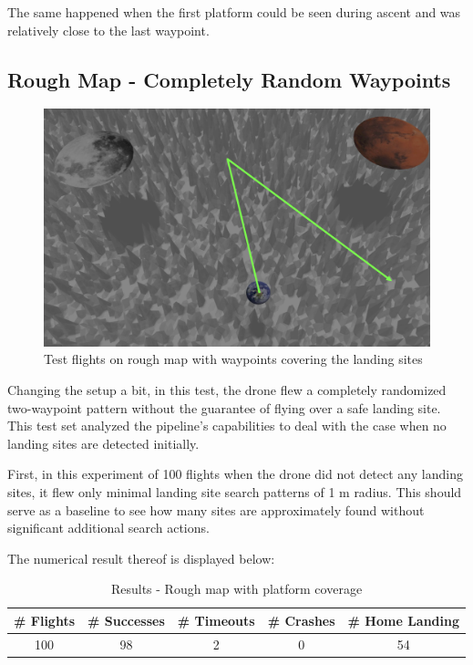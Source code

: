         The same happened when the first platform could be seen during ascent and was relatively close to the last waypoint.


\subsection{Rough Map - Completely Random Waypoints}\label{subsec:rough_map_rw}

    \begin{figure}[h]
        \centering
        \includegraphics[scale=0.24]{images/evaluation/rough_complete_rand.png}
        \caption{Test flights on rough map with waypoints covering the landing sites}
        \label{fig:rough_compl_rand}
    \end{figure}

    Changing the setup a bit, in this test, the drone flew a completely randomized two-waypoint pattern without the guarantee of flying over a safe landing site. This test set analyzed the pipeline's capabilities to deal with the case when no landing sites are detected initially.

    First, in this experiment of 100 flights when the drone did not detect any landing sites, it flew only minimal landing site search patterns of 1 m radius. This should serve as a baseline to see how many sites are approximately found without significant additional search actions.

    The numerical result thereof is displayed below:

    \begin{table}[h]
        \begin{center}
         \caption{Results - Rough map with platform coverage}\vspace{1ex}
         \label{tab:result_rough_rand}
         \begin{tabular}{|c|c|c|c|c|}
         \hline
         \# Flights & \# Successes & \# Timeouts & \# Crashes & \# Home Landing\\ \hline \hline
         100 & 98 & 2 & 0 & 54 \\
         \hline
         \end{tabular}
        \end{center}
    \end{table}

